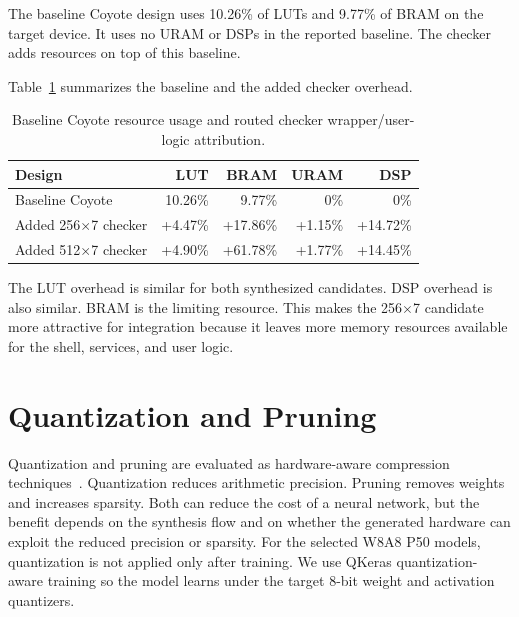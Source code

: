 The baseline Coyote design uses 10.26\% of LUTs and 9.77\% of BRAM on the target device. It uses no URAM or DSPs in the reported baseline. The checker adds resources on top of this baseline.

Table~\ref{tab:resource-context} summarizes the baseline and the added checker overhead.

\begin{table}[t]
    \centering
    \caption{Baseline Coyote resource usage and routed checker wrapper/user-logic attribution.}
    \label{tab:resource-context}
    \begin{tabular}{l r r r r}
        \toprule
        \textbf{Design} & \textbf{LUT} & \textbf{BRAM} & \textbf{URAM} & \textbf{DSP} \\
        \midrule
        Baseline Coyote &
        10.26\% &
        9.77\% &
        0\% &
        0\% \\
        \midrule
        Added 256$\times$7 checker &
        +4.47\% &
        +17.86\% &
        +1.15\% &
        +14.72\% \\
        \midrule
        Added 512$\times$7 checker &
        +4.90\% &
        +61.78\% &
        +1.77\% &
        +14.45\% \\
        \bottomrule
    \end{tabular}
\end{table}

The LUT overhead is similar for both synthesized candidates. DSP overhead is also similar. BRAM is the limiting resource. This makes the 256$\times$7 candidate more attractive for integration because it leaves more memory resources available for the shell, services, and user logic.

\section{Quantization and Pruning}
\label{sec:quantization-pruning-results}

Quantization and pruning are evaluated as hardware-aware compression techniques~\cite{coelho2020qkeras,han2016deepcompression}. Quantization reduces arithmetic precision. Pruning removes weights and increases sparsity. Both can reduce the cost of a neural network, but the benefit depends on the synthesis flow and on whether the generated hardware can exploit the reduced precision or sparsity. For the selected W8A8 P50 models, quantization is not applied only after training. We use QKeras quantization-aware training so the model learns under the target 8-bit weight and activation quantizers.

